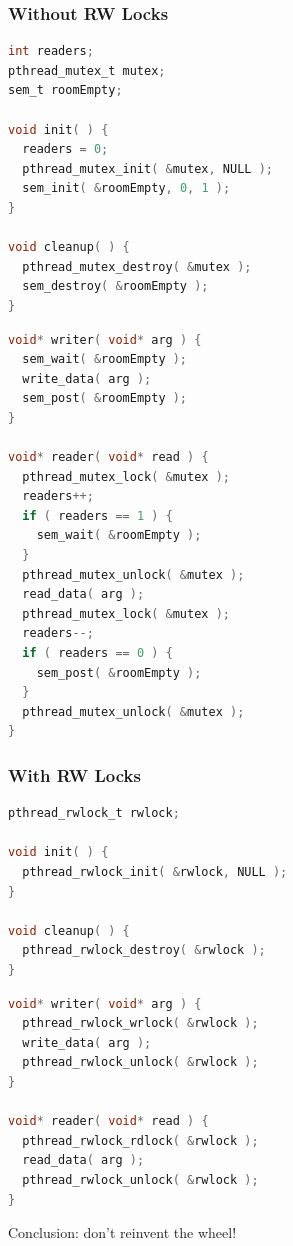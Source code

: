\begin{frame}[fragile]
\frametitle{Without RW Locks}

\begin{multicols}{2}
\begin{lstlisting}[language=C]
int readers;
pthread_mutex_t mutex;
sem_t roomEmpty;

void init( ) {
  readers = 0;
  pthread_mutex_init( &mutex, NULL );
  sem_init( &roomEmpty, 0, 1 );
}

void cleanup( ) {
  pthread_mutex_destroy( &mutex );
  sem_destroy( &roomEmpty );
}
\end{lstlisting}

\columnbreak

\begin{lstlisting}[language=C]
void* writer( void* arg ) {
  sem_wait( &roomEmpty );
  write_data( arg );
  sem_post( &roomEmpty );
}

void* reader( void* read ) {
  pthread_mutex_lock( &mutex );
  readers++;
  if ( readers == 1 ) {
    sem_wait( &roomEmpty );
  }
  pthread_mutex_unlock( &mutex );
  read_data( arg );
  pthread_mutex_lock( &mutex );
  readers--;
  if ( readers == 0 ) {
    sem_post( &roomEmpty );
  }
  pthread_mutex_unlock( &mutex );
}
\end{lstlisting}

\end{multicols}


\end{frame}


\begin{frame}[fragile]
\frametitle{With RW Locks}

\begin{multicols}{2}
\begin{lstlisting}[language=C]
pthread_rwlock_t rwlock;

void init( ) {
  pthread_rwlock_init( &rwlock, NULL );
}

void cleanup( ) {
  pthread_rwlock_destroy( &rwlock );
}
\end{lstlisting}

\columnbreak

\begin{lstlisting}[language=C]
void* writer( void* arg ) {
  pthread_rwlock_wrlock( &rwlock );
  write_data( arg );
  pthread_rwlock_unlock( &rwlock );
}

void* reader( void* read ) {
  pthread_rwlock_rdlock( &rwlock );
  read_data( arg );
  pthread_rwlock_unlock( &rwlock );
}
\end{lstlisting}

\end{multicols}

Conclusion: don't reinvent the wheel!

\end{frame}



